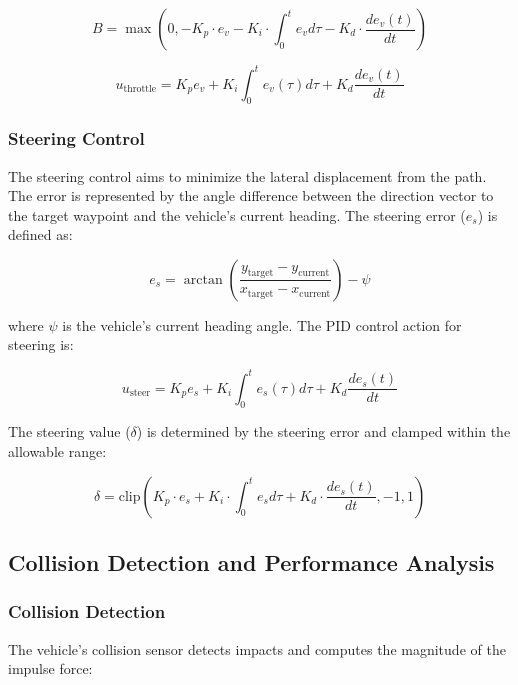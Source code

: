 \documentclass[conference]{IEEEtran}
\begin{document}
\begin{equation}
B = \max(0, -K_p \cdot e_v - K_i \cdot \int_{0}^{t} e_v d\tau - K_d \cdot \frac{de_v(t)}{dt})
\end{equation}

\begin{equation}
u_{\text{throttle}} = K_p e_v + K_i \int_{0}^{t} e_v(\tau) d\tau + K_d \frac{de_v(t)}{dt}
\end{equation}

\subsubsection{Steering Control}

The steering control aims to minimize the lateral displacement from the path. The error is represented by the angle difference between the direction vector to the target waypoint and the vehicle's current heading. The steering error ($e_s$) is defined as:

\begin{equation}
e_s = \arctan \left( \frac{y_{\text{target}} - y_{\text{current}}}{x_{\text{target}} - x_{\text{current}}} \right) - \psi
\end{equation}

where $\psi$ is the vehicle's current heading angle. The PID control action for steering is:

\begin{equation}
u_{\text{steer}} = K_p e_s + K_i \int_{0}^{t} e_s(\tau) d\tau + K_d \frac{de_s(t)}{dt}
\end{equation}

The steering value ($\delta$) is determined by the steering error and clamped within the allowable range:

\begin{equation}
\delta = \text{clip}\left( K_p \cdot e_s + K_i \cdot \int_{0}^{t} e_s d\tau + K_d \cdot \frac{de_s(t)}{dt}, -1, 1 \right)
\end{equation}

\subsection{Collision Detection and Performance Analysis}
\subsubsection{Collision Detection}
The vehicle's collision sensor detects impacts and computes the magnitude of the impulse force:
\end{document}

